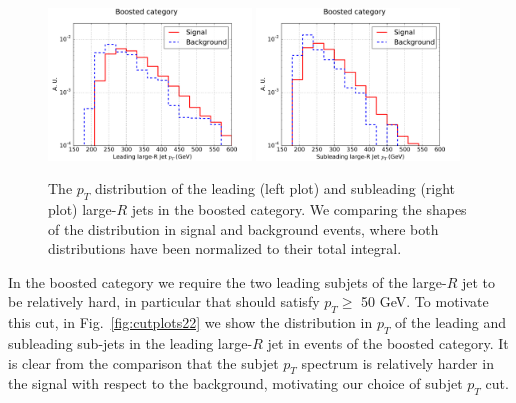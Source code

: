 \begin{figure}[t]
\begin{center}
 \includegraphics[width=0.48\textwidth]{plots/pt_H0_boost_C1.pdf}
 \includegraphics[width=0.48\textwidth]{plots/pt_H1_boost_C1.pdf}
\caption{\small  The $p_T$ distribution of the
  leading (left plot) and
  subleading (right plot) large-$R$ jets in the boosted category.
  We comparing
  the shapes of the distribution in signal and background events,
  where both
  distributions have been normalized to their total integral.
}
\label{fig:cutplots1}
\end{center}
\end{figure}


In the boosted category we require the two
leading subjets of the large-$R$ jet to be relatively
hard, in particular that should satisfy $p_T \ge $ 50 GeV.
%
To motivate this cut, in Fig.~\ref{fig:cutplots22}
we show the distribution in $p_T$ of the leading
and subleading sub-jets in the leading large-$R$ jet in events
of the boosted category.
%
It is clear from the comparison that the subjet $p_T$ spectrum is
relatively harder in the signal with respect to the background,
motivating our choice of subjet $p_T$ cut.


